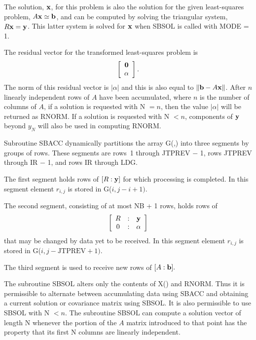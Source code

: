 \documentclass[twoside]{MATH77}
\begin{document}
The solution, ${\bf x}$, for this problem is also the solution for the given
least-squares problem, $A{\bf x}\simeq {\bf b}$, and can be computed by
solving the triangular system, $R{\bf x}={\bf y}$. This latter system is
solved for ${\bf x}$ when SBSOL is called with MODE = 1.

The residual vector for the transformed least-squares problem is
\begin{equation*}
\left[
\begin{array}{c}
\bf 0 \\
\alpha
\end{array}
\right].
\end{equation*}
The norm of this residual vector is $|\alpha |$ and this is also equal to $%
\Vert {\bf b}-A{\bf x}\Vert $. After $n$ linearly independent rows of $A$
have been accumulated, where $n$ is the number of columns of $A$, if a
solution is requested with N $=n$, then the value $|\alpha |$ will be
returned as RNORM. If a solution is requested with N $<n$, components of $%
{\bf y}$ beyond $y_N$ will also be used in computing RNORM.

Subroutine SBACC dynamically partitions the array G(,) into three segments
by groups of rows. These segments are rows~1 through JTPREV $-$ 1, rows JTPREV
through IR $-$ 1, and rows IR through LDG.

The first segment holds rows of $[R:{\bf y}]$ for which processing is
completed. In this segment element $r_{i,j}$ is stored in G($i,j-i+1).$

The second segment, consisting of at most NB + 1 rows, holds rows of%
\begin{equation*}
\left[
\begin{array}{ccc}
R & : & {\bf y} \\
0 & : & \alpha
\end{array}
\right]
\end{equation*}
that may be changed by data yet to be received. In this segment element $%
r_{i,j}$ is stored in G($i,j-\text{JTPREV}+1).$

The third segment is used to receive new rows of $[A:{\bf b}].$

The subroutine SBSOL alters only the contents of X() and RNORM. Thus it is
permissible to alternate between accumulating data using SBACC and obtaining
a current solution or covariance matrix using SBSOL. It is also permissible
to use SBSOL with N $< n$. The subroutine SBSOL can compute a solution
vector of length N whenever the portion of the $A$ matrix introduced to that
point has the property that its first N columns are linearly independent.
\end{document}
